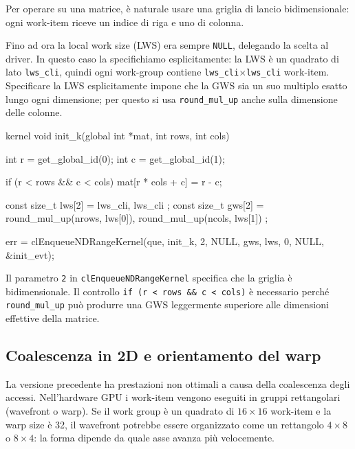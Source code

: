 Per operare su una matrice, è naturale usare una griglia di lancio bidimensionale: ogni work-item riceve un indice di riga e uno di colonna.

Fino ad ora la local work size (LWS) era sempre \texttt{NULL}, delegando la scelta al driver. In questo caso la specifichiamo esplicitamente: la LWS è un quadrato di lato \texttt{lws\_cli}, quindi ogni work-group contiene \texttt{lws\_cli}$\times$\texttt{lws\_cli} work-item. Specificare la LWS esplicitamente impone che la GWS sia un suo multiplo esatto lungo ogni dimensione; per questo si usa \texttt{round\_mul\_up} anche sulla dimensione delle colonne.

\begin{code}[caption={Kernel di inizializzazione 2D (prima versione)}, label={code:matinit_kernel_base}]
kernel void init_k(global int *mat, int rows, int cols)
{
    int r = get_global_id(0);
    int c = get_global_id(1);

    if (r < rows && c < cols) mat[r * cols + c] = r - c;
}
\end{code}

\begin{code}[caption={Lancio 2D lato host}, label={code:matinit_host_base}]
const size_t lws[2] = { lws_cli, lws_cli };
const size_t gws[2] = { round_mul_up(nrows, lws[0]),
                         round_mul_up(ncols, lws[1]) };

err = clEnqueueNDRangeKernel(que, init_k, 2, NULL, gws, lws,
                              0, NULL, &init_evt);
\end{code}

Il parametro \texttt{2} in \texttt{clEnqueueNDRangeKernel} specifica che la griglia è bidimensionale. Il controllo \texttt{if (r < rows \&\& c < cols)} è necessario perché \texttt{round\_mul\_up} può produrre una GWS leggermente superiore alle dimensioni effettive della matrice.

\subsection{Coalescenza in 2D e orientamento del warp}

La versione precedente ha prestazioni non ottimali a causa della coalescenza degli accessi. Nell'hardware GPU i work-item vengono eseguiti in gruppi rettangolari (wavefront o warp). Se il work group è un quadrato di $16 \times 16$ work-item e la warp size è 32, il wavefront potrebbe essere organizzato come un rettangolo $4 \times 8$ o $8 \times 4$: la forma dipende da quale asse avanza più velocemente.

